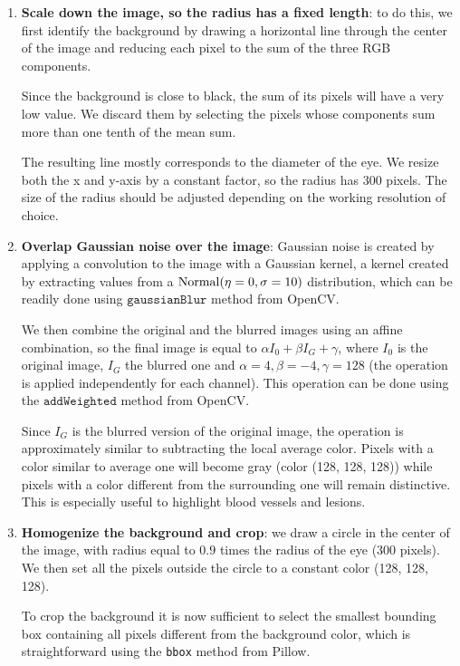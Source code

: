 \begin{enumerate}
    \item \textbf{Scale down the image, so the radius has a fixed length}: to do this, we first identify the background by drawing a horizontal line through the center of the image and reducing each pixel to the sum of the three RGB components.

    Since the background is close to black, the sum of its pixels will have a very low value. We discard them by selecting the pixels whose components sum more than one tenth of the mean sum.

    The resulting line mostly corresponds to the diameter of the eye. We resize both the x and y-axis by a constant factor, so the radius has 300 pixels. The size of the radius should be adjusted depending on the working resolution of choice.
    
    \item \textbf{Overlap Gaussian noise over the image}: Gaussian noise is created by applying a convolution to the image with a Gaussian kernel, a kernel created by extracting values from a \( \operatorname{Normal}(\eta = 0, \sigma = 10) \) distribution, which can be readily done using \( \texttt{gaussianBlur} \) method from OpenCV. 

    We then combine the original and the blurred images using an affine combination, so the final image is equal to \( \alpha I_0 + \beta I_G + \gamma \), where \( I_0 \) is the original image, \( I_G \) the blurred one and \( \alpha = 4, \beta = -4, \gamma = 128\) (the operation is applied independently for each channel). This operation can be done using the \( \texttt{addWeighted} \) method from OpenCV.

    Since \( I_G \) is the blurred version of the original image, the operation is approximately similar to subtracting the local average color. Pixels with a color similar to average one will become gray (color (128, 128, 128)) while pixels with a color different from the surrounding one will remain distinctive. This is especially useful to highlight blood vessels and lesions. 
    
    \item \textbf{Homogenize the background and crop}: we draw a circle in the center of the image, with radius equal to \( 0.9 \) times the radius of the eye (300 pixels). We then set all the pixels outside the circle to a constant color (128, 128, 128).

    To crop the background it is now sufficient to select the smallest bounding box containing all pixels different from the background color, which is straightforward using the \texttt{bbox} method from Pillow.
\end{enumerate}



